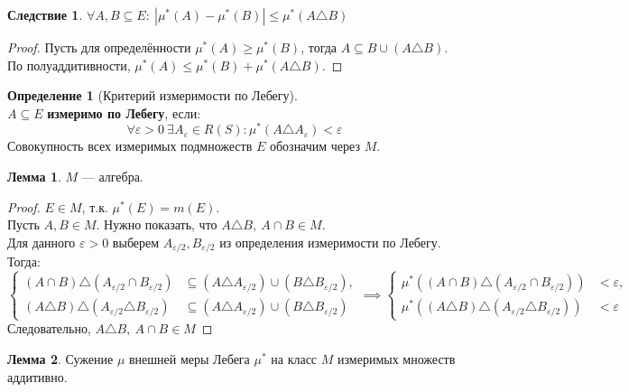 \documentclass[11pt,a4paper]{report}
\def\eps{\varepsilon}
\theoremstyle{definition}
\theoremstyle{definition}
\newtheorem{lemma}{Лемма}[section]
\newtheorem{corollary}{Следствие}[section]
\theoremstyle{definition}
\newtheorem{definition}{Определение}[section]
\begin{document}
	\begin{corollary}
		$ \forall A, B \subseteq E:\ |\mu^{*}(A) - \mu^{*}(B)| \le \mu^{*}(A \triangle B) $
	\end{corollary}
	\begin{proof}
		Пусть для определённости $ \mu^{*}(A) \ge \mu^{*}(B) $, тогда $ A \subseteq B \cup (A \triangle B) $.\\ 
		По полуаддитивности, $ \mu^{*}(A) \le \mu^{*}(B) + \mu^{*}(A \triangle B) $.
	\end{proof}
	\begin{definition}[Критерий измеримости по Лебегу]$  $\\
		$ A \subseteq E $ \textbf{измеримо по Лебегу}, если: 
		\[ \forall \eps > 0\ \exists A_{\eps} \in R(S): \mu^{*}(A \triangle A_{\eps}) < \eps \] 
		Совокупность всех измеримых подмножеств $ E $ обозначим через $ M $. 
	\end{definition}
	\begin{lemma}
		$ M $ — алгебра.
	\end{lemma}
	\begin{proof}
		$ E \in M $, т.к. $ \mu^{*}(E) = m(E) $.\\ 
		Пусть $ A, B \in M $. Нужно показать, что $ A \triangle B,\ A \cap B \in M $.\\
		Для данного $ \eps > 0 $ выберем $ A_{\eps/2}, B_{\eps/2} $ из определения измеримости по Лебегу. Тогда:\\ 
		\[ 
			\begin{cases}
				(A \cap B) \triangle (A_{\eps/2} \cap B_{\eps/2}) &\subseteq (A \triangle A_{\eps/2}) \cup (B \triangle B_{\eps/2}),\\
				(A \triangle B) \triangle (A_{\eps/2} \triangle B_{\eps/2}) &\subseteq (A \triangle A_{\eps/2}) \cup (B \triangle B_{\eps/2})
			\end{cases} \implies 
			\begin{cases}
				\mu^{*}((A \cap B) \triangle (A_{\eps/2} \cap B_{\eps/2})) &< \eps,\\
				\mu^{*}((A \triangle B) \triangle (A_{\eps/2} \triangle B_{\eps/2})) &< \eps
			\end{cases}
		\]
		Следовательно, $ A \triangle B,\ A \cap B \in M $
	\end{proof}
	\begin{lemma}
		Сужение $ \mu $ внешней меры Лебега $ \mu^{*} $ на класс $ M $ измеримых множеств аддитивно.
	\end{lemma}
\end{document}
